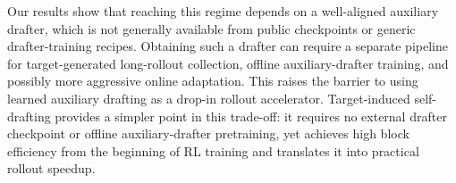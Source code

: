 \documentclass{llmxive}
\providecommand{\learned}{learned auxiliary drafting}
\providecommand{\MAL}{block efficiency}
\begin{document}
Our results show that reaching this regime depends on a well-aligned auxiliary drafter, which is not generally available from public checkpoints or generic drafter-training recipes.
Obtaining such a drafter can require a separate pipeline for target-generated long-rollout collection, offline auxiliary-drafter training, and possibly more aggressive online adaptation.
This raises the barrier to using \learned{} as a drop-in rollout accelerator.
Target-induced self-drafting provides a simpler point in this trade-off: it requires no external drafter checkpoint or offline auxiliary-drafter pretraining, yet achieves high \MAL{} from the beginning of RL training and translates it into practical rollout speedup.


% 
\end{document}
